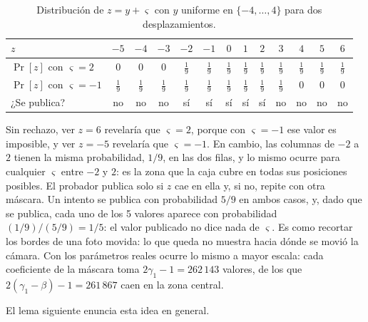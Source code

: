 \begin{table}[H]
\centering
\caption{Distribución de $z = y + \varsigma$ con $y$ uniforme en $\{-4, \dots, 4\}$ para dos desplazamientos.}
\label{tab:pqlite_rechazo_ejemplo}
\small
\setlength{\tabcolsep}{4pt}
\begin{tabular}{lcccccccccccc}
\toprule
$z$ & $-5$ & $-4$ & $-3$ & $-2$ & $-1$ & $0$ & $1$ & $2$ & $3$ & $4$ & $5$ & $6$ \\
\midrule
$\Pr[z]$ con $\varsigma = 2$ & 0 & 0 & 0 & $\tfrac{1}{9}$ & $\tfrac{1}{9}$ & $\tfrac{1}{9}$ & $\tfrac{1}{9}$ & $\tfrac{1}{9}$ & $\tfrac{1}{9}$ & $\tfrac{1}{9}$ & $\tfrac{1}{9}$ & $\tfrac{1}{9}$ \\
$\Pr[z]$ con $\varsigma = -1$ & $\tfrac{1}{9}$ & $\tfrac{1}{9}$ & $\tfrac{1}{9}$ & $\tfrac{1}{9}$ & $\tfrac{1}{9}$ & $\tfrac{1}{9}$ & $\tfrac{1}{9}$ & $\tfrac{1}{9}$ & $\tfrac{1}{9}$ & 0 & 0 & 0 \\
¿Se publica? & no & no & no & sí & sí & sí & sí & sí & no & no & no & no \\
\bottomrule
\end{tabular}
\end{table}

Sin rechazo, ver $z = 6$ revelaría que $\varsigma = 2$, porque con $\varsigma = -1$ ese valor es imposible, y ver $z = -5$ revelaría que $\varsigma = -1$. En cambio, las columnas de $-2$ a $2$ tienen la misma probabilidad, $1/9$, en las dos filas, y lo mismo ocurre para cualquier $\varsigma$ entre $-2$ y $2$: es la zona que la caja cubre en todas sus posiciones posibles. El probador publica solo si $z$ cae en ella y, si no, repite con otra máscara. Un intento se publica con probabilidad $5/9$ en ambos casos, y, dado que se publica, cada uno de los 5 valores aparece con probabilidad $(1/9)/(5/9) = 1/5$: el valor publicado no dice nada de $\varsigma$. Es como recortar los bordes de una foto movida: lo que queda no muestra hacia dónde se movió la cámara. Con los parámetros reales ocurre lo mismo a mayor escala: cada coeficiente de la máscara toma $2\gamma_1 - 1 = 262\,143$ valores, de los que $2(\gamma_1 - \beta) - 1 = 261\,867$ caen en la zona central.

El lema siguiente enuncia esta idea en general.

